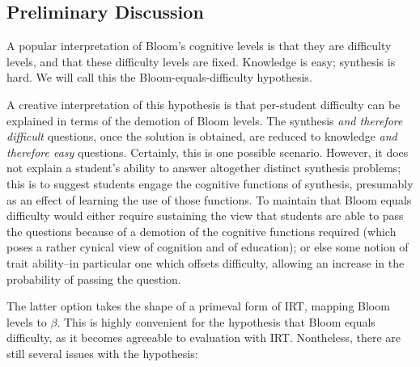 \documentclass[a4paper,twocolumn]{article}
\begin{document}
\subsection{Preliminary Discussion}

A popular interpretation of Bloom's cognitive levels is that they are
difficulty levels, and that these difficulty levels are fixed.  Knowledge is
easy; synthesis is hard.  We will call this the Bloom-equals-difficulty
hypothesis.

A creative interpretation of this hypothesis is that per-student difficulty can
be explained in terms of the demotion of Bloom levels.  The synthesis \emph{and
therefore difficult} questions, once the solution is obtained, are reduced to
knowledge \emph{and therefore easy} questions.  Certainly, this is one possible
scenario.  However, it does not explain a student's ability to answer
altogether distinct synthesis problems; this is to suggest students engage the
cognitive functions of synthesis, presumably as an effect of learning the use
of those functions.  To maintain that Bloom equals difficulty would either
require sustaining the view that students are able to pass the questions
because of a demotion of the cognitive functions required (which poses a rather
cynical view of cognition and of education); or else some notion of trait
ability--in particular one which offsets difficulty, allowing an increase in
the probability of passing the question.

The latter option takes the shape of a primeval form of IRT, mapping Bloom
levels to $\beta$.  This is highly convenient for the hypothesis that Bloom
equals difficulty, as it becomes agreeable to evaluation with IRT.  Nontheless,
there are still several issues with the hypothesis:

\end{document}
